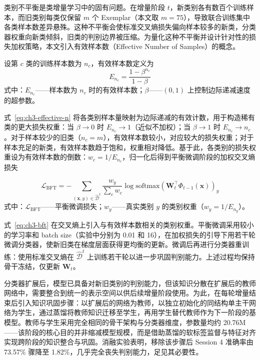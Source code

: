 类别不平衡是类增量学习中的固有问题。在增量阶段 $t$，新类别各有数百个训练样本，而旧类别每类仅保留 $m$ 个 Exemplar（本文取 $m=75$），导致联合训练集中各类样本数差异悬殊。这种不平衡会使标准交叉熵损失偏向样本较多的新类，分类器权重向新类倾斜，旧类的判别边界被压缩。为量化这种不平衡并设计针对性的损失加权策略，本文引入有效样本数（Effective Number of Samples）的概念\cite{cui2019classbalanced}。

设第 $c$ 类的训练样本数为 $n_c$，有效样本数定义为
\begin{equation}\label{eq:ch3-effective-n}
E_{n_c} = \frac{1 - \beta^{n_c}}{1 - \beta}
\end{equation}
\noindent 式中：$E_{n_c}$——样本数为 $n_c$ 时的有效样本数；$\beta$——$(0,1)$ 上控制边际递减速度的超参数。

式~\eqref{eq:ch3-effective-n} 将各类别样本量映射为边际递减的有效计数，用于构造稀有类的更大损失权重：当 $\beta \to 0$ 时 $E_{n_c} \to 1$（近似不加权）；当 $\beta \to 1$ 时 $E_{n_c} \to n_c$。对于样本较少的旧类（$n_c = m$），有效样本数较小，对应较大的损失权重；对于样本充足的新类，有效样本数趋于饱和，权重相对降低。基于此，各类别的损失权重设为有效样本数的倒数：$w_c = 1 / E_{n_c}$，归一化后得到平衡微调阶段的加权交叉熵损失

\begin{equation}\label{eq:ch3-bft}
\mathcal{L}_{\mathrm{BFT}} = -\sum_{(\mathbf{x},y) \in \hat{\mathcal{D}}^t} \frac{w_y}{\sum_{c} w_c} \log \mathrm{softmax}\left(\mathbf{W}_t^\top \Phi_{t-1}(\mathbf{x})\right)_y
\end{equation}
\noindent 式中：$\mathcal{L}_{\mathrm{BFT}}$——平衡微调损失；$w_y$——真实类别 $y$ 的类别权重（$w_y=1/E_{n_y}$）。

式~\eqref{eq:ch3-bft} 在交叉熵上引入与有效样本数相关的类别权重。平衡微调采用较小的学习率和 batch size（实验中分别为 0.01 和 16），在加权损失的引导下用若干轮微调分类器，使新旧类在梯度层面获得更均衡的更新。微调后再进行分类器重训练：使用标准交叉熵在 $\hat{\mathcal{D}}^t$ 上训练若干轮以进一步巩固判别能力。上述过程均保持骨干冻结，仅更新 $\mathbf{W}_t$。


分类器扩展后，模型已具备对新旧类别的判别能力，但该知识分散在扩展后的教师网络中，需要整合到统一的表示空间以供后续增量阶段使用。为此，在每轮增量结束后引入知识巩固步骤：以扩展后的网络为教师，以独立初始化的同结构单主干网络为学生，通过蒸馏将教师知识迁移至学生，再用学生替代教师作为下一阶段的基模型。教师与学生采用完全相同的骨干架构与分类器维度，参数量均约 20.76M——该阶段的核心目的并非缩减模型规模，而是借助蒸馏的软标签监督与特征对齐实现跨阶段的知识整合与巩固。消融实验表明，移除该步骤后 Session 4 准确率由 73.57\% 骤降至 1.82\%，几乎完全丧失判别能力，足见其必要性。

